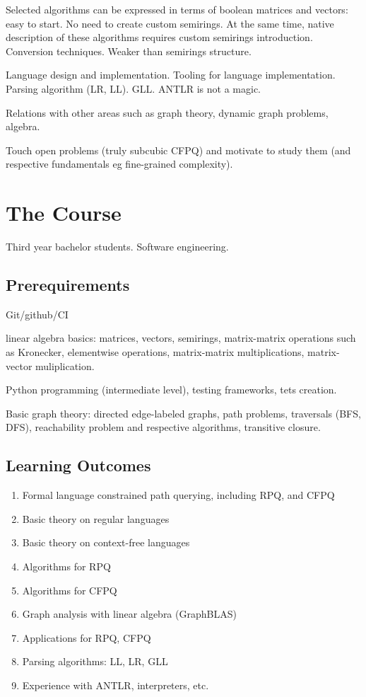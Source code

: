\documentclass[sigconf]{acmart}
\begin{document}
Selected algorithms can be expressed in terms of boolean matrices and vectors: easy to start.
No need to create custom semirings.
At the same time, native description of these algorithms requires custom semirings introduction.
Conversion techniques.
Weaker than semirings structure. 

Language design and implementation. 
Tooling for language implementation.
Parsing algorithm (LR, LL).
GLL. 
ANTLR is not a magic. 

Relations with other areas such as graph theory, dynamic graph problems, algebra.

Touch open problems (truly subcubic CFPQ) and motivate to study them (and respective fundamentals eg fine-grained complexity).

\section{The Course}

Third year bachelor students.
Software engineering. 

\subsection{Prerequirements}



Git/github/CI

linear algebra basics: matrices, vectors, semirings, matrix-matrix operations such as Kronecker, elementwise operations, matrix-matrix multiplications, matrix-vector muliplication.

Python programming (intermediate level), testing frameworks, tets creation. 

Basic graph theory: directed edge-labeled graphs, path problems, traversals (BFS, DFS), reachability problem and respective algorithms, transitive closure.

\subsection{Learning Outcomes}

\begin{enumerate}
  \item Formal language constrained path querying, including RPQ, and CFPQ
  \item Basic theory on regular languages
  \item Basic theory on context-free languages
  \item Algorithms for RPQ
  \item Algorithms for CFPQ
  \item Graph analysis with linear algebra (GraphBLAS)
  \item Applications for RPQ, CFPQ
  \item Parsing algorithms: LL, LR, GLL
  \item Experience with ANTLR, interpreters, etc.
\end{enumerate}
\end{document}
